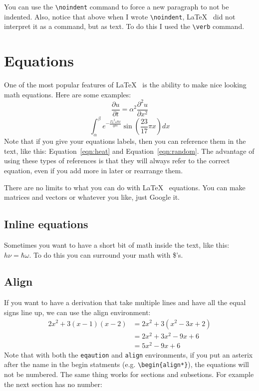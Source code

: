 \documentclass[twocolumn,10 pt,showpacs,preprintnumbers,amsmath,amssymb]{revtex4-1}
\newcommand{\parl}[2]{\frac{\partial #1}{\partial #2}}
\begin{document}
\noindent You can use the \verb_\noindent_ command to force a new
paragraph to not be indented.  Also, notice that above when I wrote
\verb_\noindent_, \LaTeX~ did not interpret it as a command, but as
text.  To do this I used the \verb_\verb_ command.

\section{Equations}

One of the most popular features of \LaTeX~ is the ability to make nice
looking math equations.  Here are some examples: 
\begin{equation}
  \parl{u}{t} = \alpha^2 \parl{^2u}{x^2}
  \label{eqn:heat}
\end{equation}
\begin{equation}
  \int_{\alpha}^{\beta} e^{-\frac{{\Gamma_0}^2\omega b x}{q \sigma \epsilon}}\sin\left(
  \frac{23}{17}\pi x\right)dx
  \label{eqn:random}
\end{equation}
Note that if you give your equations labels, then you can reference them
in the text, like this: Equation~\ref{eqn:heat} and
Equation~\ref{eqn:random}.  The advantage of using these types of
references is that they will always refer to the correct equation, even
if you add more in later or rearrange them.

There are no limits to what you can do with \LaTeX~ equations. You can
make matrices and vectors or whatever you like, just Google it.

\subsection{Inline equations}

Sometimes you want to have a short bit of math inside the text, like
this: $h\nu = \hbar\omega$.  To do this you can surround your math with
\$'s.

\subsection{Align}

If you want to have a derivation that take multiple lines and have all the equal
signs line up, we can use the align environment:
\begin{align*}
  2x^2 + 3(x-1)(x-2) &= 2x^2 + 3(x^2-3x+2)\\
                     &= 2x^2 + 3x^2 - 9x + 6\\
                     &= 5x^2 - 9x + 6
\end{align*}
Note that with both the \verb_eqaution_ and \verb_align_ environments,
if you put an asterix after the name in the begin statments (e.g.
\verb_\begin{align*}_), the equations will not be numbered.  The same
thing works for sections and subsetions. For example the next section
has no number:
\end{document}
